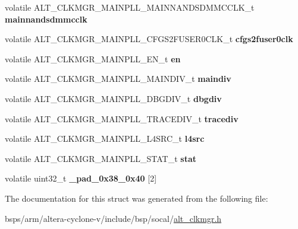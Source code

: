 \begin{DoxyCompactItemize}
\mbox{\label{structALT__CLKMGR__MAINPLL__s_a28b9ad83e63ac19c61cba7728b08b8b9}} 
volatile A\+L\+T\+\_\+\+C\+L\+K\+M\+G\+R\+\_\+\+M\+A\+I\+N\+P\+L\+L\+\_\+\+M\+A\+I\+N\+N\+A\+N\+D\+S\+D\+M\+M\+C\+C\+L\+K\+\_\+t {\bfseries mainnandsdmmcclk}
\item 
\mbox{\label{structALT__CLKMGR__MAINPLL__s_a02509082d6a5de7abbdbff7ecd817b1b}} 
volatile A\+L\+T\+\_\+\+C\+L\+K\+M\+G\+R\+\_\+\+M\+A\+I\+N\+P\+L\+L\+\_\+\+C\+F\+G\+S2\+F\+U\+S\+E\+R0\+C\+L\+K\+\_\+t {\bfseries cfgs2fuser0clk}
\item 
\mbox{\label{structALT__CLKMGR__MAINPLL__s_a673fdf06927d32633e1fb8475781dfee}} 
volatile A\+L\+T\+\_\+\+C\+L\+K\+M\+G\+R\+\_\+\+M\+A\+I\+N\+P\+L\+L\+\_\+\+E\+N\+\_\+t {\bfseries en}
\item 
\mbox{\label{structALT__CLKMGR__MAINPLL__s_ae970ea118aa1603fbd5fb72dc20c220f}} 
volatile A\+L\+T\+\_\+\+C\+L\+K\+M\+G\+R\+\_\+\+M\+A\+I\+N\+P\+L\+L\+\_\+\+M\+A\+I\+N\+D\+I\+V\+\_\+t {\bfseries maindiv}
\item 
\mbox{\label{structALT__CLKMGR__MAINPLL__s_af8b569e9529a76e2934861602fe49068}} 
volatile A\+L\+T\+\_\+\+C\+L\+K\+M\+G\+R\+\_\+\+M\+A\+I\+N\+P\+L\+L\+\_\+\+D\+B\+G\+D\+I\+V\+\_\+t {\bfseries dbgdiv}
\item 
\mbox{\label{structALT__CLKMGR__MAINPLL__s_a076b0a3243566870b0fe24a12b94699c}} 
volatile A\+L\+T\+\_\+\+C\+L\+K\+M\+G\+R\+\_\+\+M\+A\+I\+N\+P\+L\+L\+\_\+\+T\+R\+A\+C\+E\+D\+I\+V\+\_\+t {\bfseries tracediv}
\item 
\mbox{\label{structALT__CLKMGR__MAINPLL__s_a84c56d416363c08aa17ce98c2ce89e49}} 
volatile A\+L\+T\+\_\+\+C\+L\+K\+M\+G\+R\+\_\+\+M\+A\+I\+N\+P\+L\+L\+\_\+\+L4\+S\+R\+C\+\_\+t {\bfseries l4src}
\item 
\mbox{\label{structALT__CLKMGR__MAINPLL__s_a6a843a3d4d8d39925fb9ea9bceae2e7f}} 
volatile A\+L\+T\+\_\+\+C\+L\+K\+M\+G\+R\+\_\+\+M\+A\+I\+N\+P\+L\+L\+\_\+\+S\+T\+A\+T\+\_\+t {\bfseries stat}
\item 
\mbox{\label{structALT__CLKMGR__MAINPLL__s_ac81adb9e3465b27bac51ab82ec781296}} 
volatile uint32\+\_\+t {\bfseries \+\_\+pad\+\_\+0x38\+\_\+0x40} \mbox{[}2\mbox{]}
\end{DoxyCompactItemize}


The documentation for this struct was generated from the following file\+:\begin{DoxyCompactItemize}
\item 
bsps/arm/altera-\/cyclone-\/v/include/bsp/socal/\mbox{\hyperlink{alt__clkmgr_8h}{alt\+\_\+clkmgr.\+h}}\end{DoxyCompactItemize}

